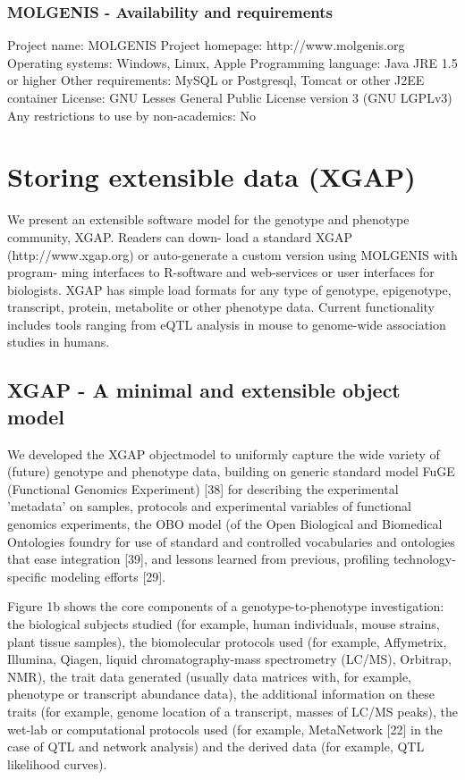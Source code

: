 \documentclass[8pt, twoside, a5paper]{report}
\begin{document}
\subsubsection{MOLGENIS - Availability and requirements}

Project name: MOLGENIS
Project homepage: http://www.molgenis.org
Operating systems: Windows, Linux, Apple
Programming language: Java JRE 1.5 or higher
Other requirements: MySQL or Postgresql, Tomcat or other J2EE container
License: GNU Lesses General Public License version 3 (GNU LGPLv3)
Any restrictions to use by non-academics: No

\section{Storing extensible data (XGAP)}
We present an extensible software model for the genotype and phenotype community, XGAP. Readers can down-
load a standard XGAP (http://www.xgap.org) or auto-generate a custom version using MOLGENIS with program-
ming interfaces to R-software and web-services or user interfaces for biologists. XGAP has simple load formats for
any type of genotype, epigenotype, transcript, protein, metabolite or other phenotype data. Current functionality
includes tools ranging from eQTL analysis in mouse to genome-wide association studies in humans.

\subsection{XGAP - A minimal and extensible object model}

We developed the XGAP objectmodel to uniformly capture the wide variety of (future) genotype and phenotype data, building 
on generic standard model FuGE (Functional Genomics Experiment) [38] for describing the experimental 'metadata' on samples, protocols and
experimental variables of functional genomics experiments, the OBO model (of the Open Biological and Biomedical Ontologies foundry for use of standard and
controlled vocabularies and ontologies that ease integration [39], and lessons learned from previous, profiling technology-specific modeling efforts [29].

Figure 1b shows the core components of a genotype-to-phenotype investigation: the biological subjects studied (for example, human individuals, mouse strains,
plant tissue samples), the biomolecular protocols used (for example, Affymetrix, Illumina, Qiagen, liquid chromatography-mass spectrometry (LC/MS), Orbitrap,
NMR), the trait data generated (usually data matrices with, for example, phenotype or transcript abundance data), the additional information on these traits (for
example, genome location of a transcript, masses of LC/MS peaks), the wet-lab or computational protocols used (for example, MetaNetwork [22] in the case of QTL and
network analysis) and the derived data (for example, QTL likelihood curves).
\end{document}
